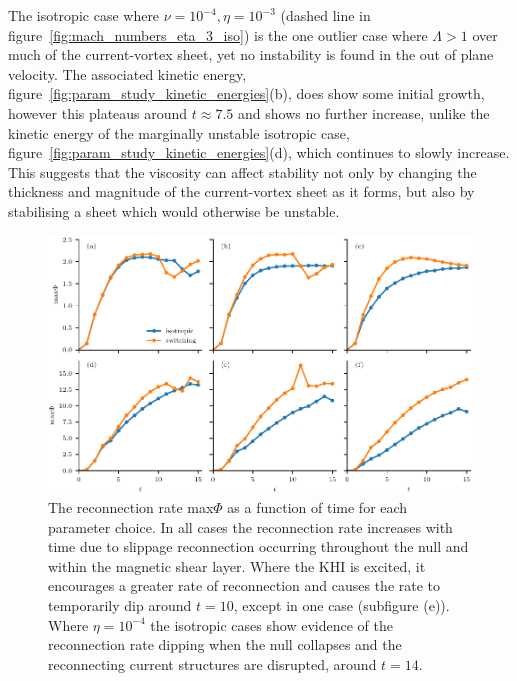 The isotropic case where $\nu=10^{-4},\eta=10^{-3}$ (dashed line in figure~\ref{fig:mach_numbers_eta_3_iso}) is the one outlier case where $\Lambda > 1$ over much of the current-vortex sheet, yet no instability is found in the out of plane velocity. The associated kinetic energy, figure~\ref{fig:param_study_kinetic_energies}(b), does show some initial growth, however this plateaus around $t\approx7.5$ and shows no further increase, unlike the kinetic energy of the marginally unstable isotropic case, figure~\ref{fig:param_study_kinetic_energies}(d), which continues to slowly increase. This suggests that the viscosity can affect stability not only by changing the thickness and magnitude of the current-vortex sheet as it forms, but also by stabilising a sheet which would otherwise be unstable. 

\begin{figure}[t]
  \centering
  \includegraphics[width=1.0\linewidth]{param_study/reconnection_rate.pdf}
  \caption{The reconnection rate max$\Phi$ as a function of time for each parameter choice. In all cases the reconnection rate increases with time due to slippage reconnection occurring throughout the null and within the magnetic shear layer. Where the KHI is excited, it encourages a greater rate of reconnection and causes the rate to temporarily dip around $t=10$, except in one case (subfigure (e)). Where $\eta=10^{-4}$ the isotropic cases show evidence of the reconnection rate dipping when the null collapses and the reconnecting current structures are disrupted, around $t=14$.}%
  \label{fig:khi_param_study_reconnection_rate}
\end{figure}

